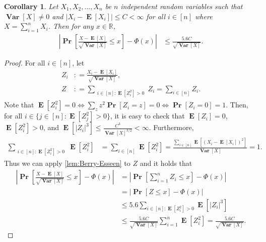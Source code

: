 \documentclass[letterpaper,11pt]{article}
\newtheorem{corollary}[theorem]{Corollary}
\renewcommand\Pr{\mathop{\mathbf{Pr}}}
\DeclareMathOperator{\E}{\mathbf{E}}
\newcommand{\Var}{\mathop{\mathbf{Var}}}%
\def\defeq{\mathrel{\mathop:}=}%
\begin{document}
\begin{corollary}\label{cor:BEbound_cor}
Let $X_1, X_2,\ldots, X_n$ be $n$ independent random variables such that $\Var[X]\neq 0$ and $|X_i-\E[X_i]|\leq C<\infty$ for all $i\in [n]$ where $X=\sum_{i=1}^nX_i$.
Then for any $x\in \mathbb{R}$,
\begin{align*}
\left|\Pr\left[\frac{X-\E[X]}{\sqrt{\Var[X]}}\leq x\right]-\Phi(x)\right|
&\leq \frac{5.6C}{\sqrt{\Var[X]}}.
\end{align*}
\end{corollary}
\begin{proof}
For all $i\in [n]$, let
\begin{align*}
Z_i&\defeq \frac{X_i-\E[X_i]}{\sqrt{\Var[X]}}, \\
Z&\defeq \sum_{\substack{i\in [n]: \E[Z_i^2]>0}}Z_i
=\sum_{i\in [n]}Z_i.
\end{align*}
Note that 
$\E[Z_i^2]=0
\iff \sum_{z}z^2\Pr[Z_i=z]=0
\iff \Pr[Z_i=0]=1$.
Then, for all $i\in \{j\in [n]: \E[Z_j^2]> 0\}$, 
it is easy to check that
$\E[Z_i]=0$, 
$\E[Z_i^2]>0$, and 
$\E[|Z_i|^3]\leq \frac{C^3}{\Var[X]^{3/2}}<\infty$.
Furthermore,  
\begin{align*}
\sum_{\substack{i\in [n]:\E[Z_i^2]>0}}\E[Z_i^2]
&=\sum_{i\in [n]}\E[Z_i^2]
=\frac{\sum_{i\in [n]}\E[(X_i-\E[X_i])^2]}{\Var[X]}=1.
\end{align*}
Thus we can apply \cref{lem:Berry-Esseen} to $Z$ and it holds that
\begin{align*}
\left|\Pr\left[\frac{X-\E[X]}{\sqrt{\Var[X]}} \leq x\right]-\Phi(x)\right|
&=\left|\Pr\left[\sum_{i=1}^n Z_i \leq x\right]-\Phi(x)\right|\\
&=\left|\Pr\left[Z \leq x\right]-\Phi(x)\right|\\
&\leq 5.6 \sum_{i\in[n]:\E[Z_i^2]>0}\E[|Z_i|^3]\\
&\leq \frac{5.6C}{\sqrt{\Var[X]}} \sum_{i=1}^n\E[Z_i^2]
=\frac{5.6C}{\sqrt{\Var[X]}}.
\end{align*}
\end{proof}
\end{document}
